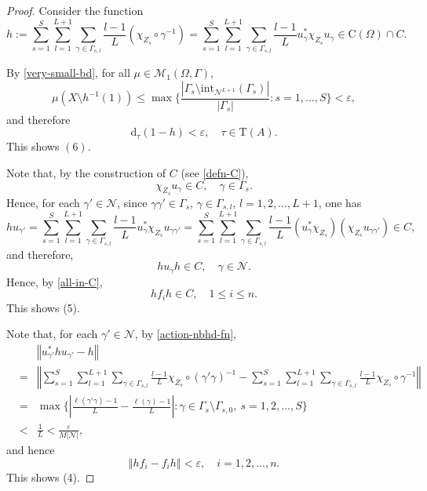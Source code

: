 \documentclass[12pt, oneside, psamsfonts]{amsart}
\theoremstyle{definition}
\theoremstyle{remark}
\numberwithin{equation}{section}
\newcommand{\norm}[1]{\left\Vert#1\right\Vert}
\newcommand{\abs}[1]{\left\vert#1\right\vert}
\newcommand{\eps}{\varepsilon}
\begin{document}
\begin{proof}
Consider the function 
$$h := \sum_{s=1}^S\sum_{l=1}^{L+1} \sum_{\gamma\in \Gamma_{s, l}} \frac{l-1}{L}(\chi_{Z_s}\circ \gamma^{-1}) = \sum_{s=1}^S \sum_{l=1}^{L+1} \sum_{\gamma\in \Gamma_{s, l}} \frac{l-1}{L} u^*_\gamma\chi_{Z_s} u_\gamma \in\mathrm{C}(\Omega)\cap C.$$


By \eqref{very-small-bd}, for all $\mu \in \mathcal M_1(\Omega, \Gamma)$,
$$
 \mu(X \setminus h^{-1}(1))  \leq  \max\{\frac{\abs{\Gamma_s \setminus \mathrm{int}_{\mathcal N^{L+1}} (\Gamma_s)} }{\abs{\Gamma_s}} : s=1, ..., S \}  < \eps,
$$
and therefore
$$\mathrm{d}_{\tau}(1-h) < \eps,\quad \tau \in \mathrm{T}(A).$$
This shows $(6)$.

Note that, by the construction of $C$ (see \eqref{defn-C}), $$\chi_{Z_s} u_\gamma \in C,\quad \gamma \in\Gamma_s.$$
Hence, for each $\gamma'\in \mathcal N$, since $\gamma\gamma' \in \Gamma_s$, $\gamma\in \Gamma_{s, l}$, $l=1, 2, ..., L+1$, one has
$$ hu_{\gamma'} = \sum_{s=1}^S \sum_{l=1}^{L+1} \sum_{\gamma\in \Gamma_{s, l}} \frac{l-1}{L} u^*_\gamma\chi_{Z_s} u_{\gamma\gamma'}  = \sum_{s=1}^S \sum_{l=1}^{L+1} \sum_{\gamma\in \Gamma_{s, l}} \frac{l-1}{L} (u^*_\gamma\chi_{Z_s}) (\chi_{Z_s} u_{\gamma\gamma'})  \in C,$$
and therefore, 
$$hu_\gamma h \in C,\quad \gamma \in \mathcal N.$$ 
Hence, by \eqref{all-in-C},  
$$hf_i h\in C,\quad 1 \leq i\leq n.$$
This shows (5).



Note that, for each $\gamma' \in\mathcal N$, by \eqref{action-nbhd-fn}, 
\begin{eqnarray*}
&& \norm{u^*_{\gamma'}hu_{\gamma'} - h}  \\
& = & \norm{ \sum_{s=1}^S\sum_{l=1}^{L+1} \sum_{\gamma\in \Gamma_{s, l}} \frac{l-1}{L}\chi_{Z_s}\circ (\gamma'\gamma)^{-1}  -  \sum_{s=1}^S\sum_{l=1}^{L+1} \sum_{\gamma\in \Gamma_{s, l}} \frac{l-1}{L} \chi_{Z_s}\circ \gamma^{-1}} \\
& = & \max\{ \abs{ \frac{\ell(\gamma'\gamma)-1}{L} - \frac{\ell(\gamma)-1}{L}}: \gamma\in\Gamma_s\setminus\Gamma_{s, 0},\ s=1, 2, ..., S \}\\
& < & \frac{1}{L}  <  \frac{\eps}{M\abs{\mathcal{N}}},
\end{eqnarray*}
and hence
\begin{equation}\label{pre-comm-p}
\norm{hf_i - f_i h} < {\eps},\quad i=1, 2, ..., n.
\end{equation}
This shows (4).
\end{proof}
\end{document}
